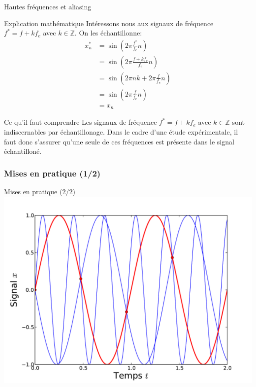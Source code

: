 \documentclass[8pt,a4paper]{beamer}
\begin{document}
  
  \begin{frame}{Hautes fréquences et aliasing}
  
  \begin{block}{Explication mathématique}
  Intéressons nous aux signaux de fréquence $f^*=f+k f_e$ avec $k\in \mathbb{Z}$. On les échantillonne:
  \begin{align}
  x_n^* & = \sin(2\pi \frac{f^*}{f_e}n) \nonumber \\
  & = \sin(2\pi \frac{f+k f_e}{f_e}n) \nonumber \\ 
  & = \sin(2\pi n k + 2\pi \frac{f}{f_e}n) \nonumber \\ 
  & = \sin(2\pi \frac{f}{f_e}n) \nonumber \\
  & = x_n \nonumber
  \end{align}
  \end{block}
  \begin{alertblock}{Ce qu'il faut comprendre}
  Les signaux de fréquence $f^*=f+k f_e$ avec $k\in \mathbb{Z}$ sont indiscernables par échantillonage. Dans le cadre d'une étude expérimentale, il faut donc s'assurer qu'une seule de ces fréquences est présente dans le signal échantilloné.
  \end{alertblock}
  \end{frame}
  
  \begin{frame}[containsverbatim]
  \frametitle{Mises en pratique (1/2)}
  
  \end{frame}
  
  \begin{frame}{Mises en pratique (2/2)}
  \includegraphics[width=.9\textwidth]{figures/exemple_aliasing.pdf}\\
  \end{frame}
  
\end{document}
